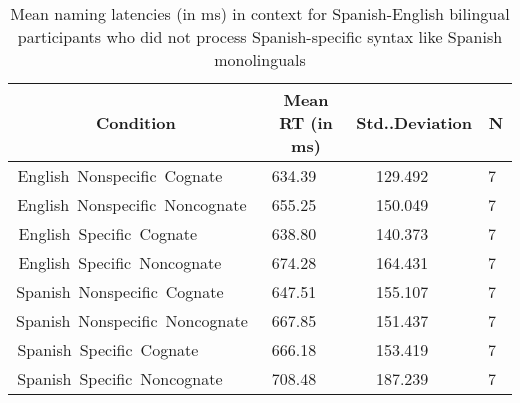 \begin{table}[hptb]
\begin{center}
\begin{tabular}{|c|c|c|c|} \hline
\multicolumn{1}{|c|}{Condition}&\multicolumn{1}{c|}{Mean RT (in ms)}&\multicolumn{1}{c|}{Std..Deviation}&\multicolumn{1}{c|}{N}\\ \hline\hline
English~Nonspecific~Cognate~~~~&634.39~~~&129.492~~~&7~\\ 
English~Nonspecific~Noncognate~&655.25~~~&150.049~~~&7~\\
\hline
English~Specific~Cognate~~~~~~~&638.80~~~&140.373~~~&7~\\
English~Specific~Noncognate~~~~&674.28~~~&164.431~~~&7~\\
\hline\hline
Spanish~Nonspecific~Cognate~~~~&647.51~~~&155.107~~~&7~\\
Spanish~Nonspecific~Noncognate~&667.85~~~&151.437~~~&7~\\
\hline
Spanish~Specific~Cognate~~~~~~~&666.18~~~&153.419~~~&7~\\
Spanish~Specific~Noncognate~~~~&708.48~~~&187.239~~~&7~\\
\hline
\end{tabular}
\caption{Mean naming latencies (in ms) in context for Spanish-English bilingual participants who did not process Spanish-specific syntax like Spanish monolinguals}\label{spec_slower_means}
\end{center}
\end{table}
